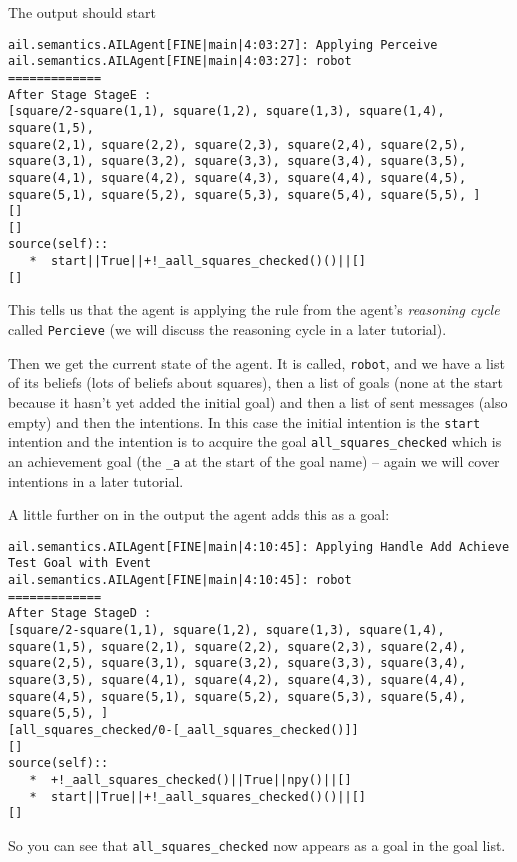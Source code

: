 The output should start
\begin{verbatim}
ail.semantics.AILAgent[FINE|main|4:03:27]: Applying Perceive 
ail.semantics.AILAgent[FINE|main|4:03:27]: robot
=============
After Stage StageE :
[square/2-square(1,1), square(1,2), square(1,3), square(1,4), square(1,5), 
square(2,1), square(2,2), square(2,3), square(2,4), square(2,5), 
square(3,1), square(3,2), square(3,3), square(3,4), square(3,5), 
square(4,1), square(4,2), square(4,3), square(4,4), square(4,5), 
square(5,1), square(5,2), square(5,3), square(5,4), square(5,5), ]
[]
[]
source(self):: 
   *  start||True||+!_aall_squares_checked()()||[]
[] 
\end{verbatim}
This tells us that the agent is applying the rule from the agent's
\emph{reasoning cycle} called
\texttt{Percieve} (we will discuss the
reasoning cycle in a later tutorial). 

Then we get the current state of the agent.  It is called,
\texttt{robot}, and we have a list of its beliefs (lots
of beliefs about squares), then a list of goals (none at
the start because it hasn't yet added the initial
goal) and then a list of sent
messages (also
empty) and then the intentions.  In this case the
initial intention is the \texttt{start}
intention and the intention is to acquire the
goal \texttt{all\_squares\_checked} which is an achievement goal (the
\texttt{\_a} at the start of the goal name) -- again we will cover
intentions in a later tutorial. 

A little further on in the output the agent adds this as a goal:
\begin{verbatim}
ail.semantics.AILAgent[FINE|main|4:10:45]: Applying Handle Add Achieve Test Goal with Event 
ail.semantics.AILAgent[FINE|main|4:10:45]: robot
=============
After Stage StageD :
[square/2-square(1,1), square(1,2), square(1,3), square(1,4), square(1,5), square(2,1), square(2,2), square(2,3), square(2,4), square(2,5), square(3,1), square(3,2), square(3,3), square(3,4), square(3,5), square(4,1), square(4,2), square(4,3), square(4,4), square(4,5), square(5,1), square(5,2), square(5,3), square(5,4), square(5,5), ]
[all_squares_checked/0-[_aall_squares_checked()]]
[]
source(self):: 
   *  +!_aall_squares_checked()||True||npy()||[]
   *  start||True||+!_aall_squares_checked()()||[]
[] 
\end{verbatim}
So you can see that \texttt{all\_squares\_checked} now appears as a goal in the goal list. 

